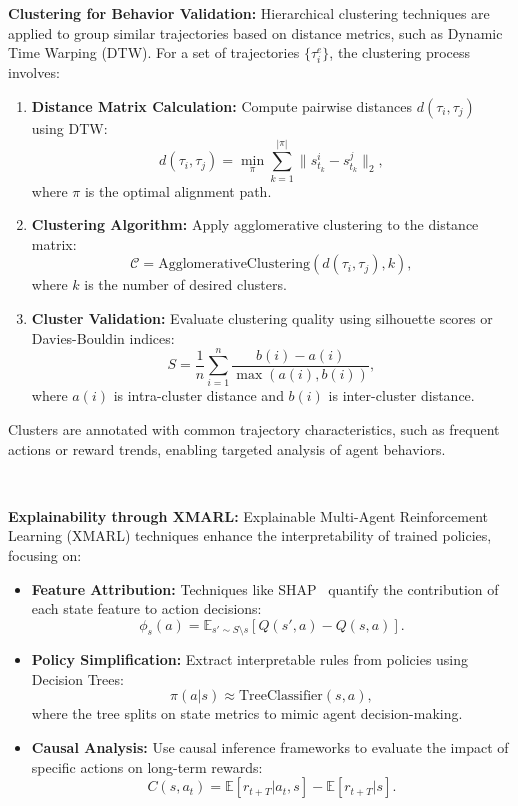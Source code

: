 \documentclass[conference]{IEEEtran}
\begin{document}
\noindent\textbf{Clustering for Behavior Validation:}
Hierarchical clustering techniques are applied to group similar trajectories based on distance metrics, such as Dynamic Time Warping (DTW). For a set of trajectories $\{\tau_i^e\}$, the clustering process involves:
\begin{enumerate}
    \item \textbf{Distance Matrix Calculation:} Compute pairwise distances $d(\tau_i, \tau_j)$ using DTW:
    \[
    d(\tau_i, \tau_j) = \min_{\pi} \sum_{k=1}^{|\pi|} \|s_{t_k}^i - s_{t_k}^j\|_2,
    \]
    where $\pi$ is the optimal alignment path.
    \item \textbf{Clustering Algorithm:} Apply agglomerative clustering to the distance matrix:
    \[
    \mathcal{C} = \text{AgglomerativeClustering}(d(\tau_i, \tau_j), k),
    \]
    where $k$ is the number of desired clusters.
    \item \textbf{Cluster Validation:} Evaluate clustering quality using silhouette scores or Davies-Bouldin indices:
    \[
    S = \frac{1}{n} \sum_{i=1}^n \frac{b(i) - a(i)}{\max(a(i), b(i))},
    \]
    where $a(i)$ is intra-cluster distance and $b(i)$ is inter-cluster distance.
\end{enumerate}

Clusters are annotated with common trajectory characteristics, such as frequent actions or reward trends, enabling targeted analysis of agent behaviors.

\

\noindent\textbf{Explainability through XMARL:}
Explainable Multi-Agent Reinforcement Learning (XMARL) techniques enhance the interpretability of trained policies, focusing on:
\begin{itemize}
    \item \textbf{Feature Attribution:} Techniques like SHAP~\cite{SHAP2020} quantify the contribution of each state feature to action decisions:
    \[
    \phi_{s}(a) = \mathbb{E}_{s' \sim S \setminus s} \left[ Q(s', a) - Q(s, a) \right].
    \]
    \item \textbf{Policy Simplification:} Extract interpretable rules from policies using Decision Trees:
    \[
    \pi(a|s) \approx \text{TreeClassifier}(s, a),
    \]
    where the tree splits on state metrics to mimic agent decision-making.
    \item \textbf{Causal Analysis:} Use causal inference frameworks to evaluate the impact of specific actions on long-term rewards:
    \[
    C(s, a_t) = \mathbb{E}[r_{t+T}|a_t, s] - \mathbb{E}[r_{t+T}|s].
    \]
\end{itemize}
\end{document}
